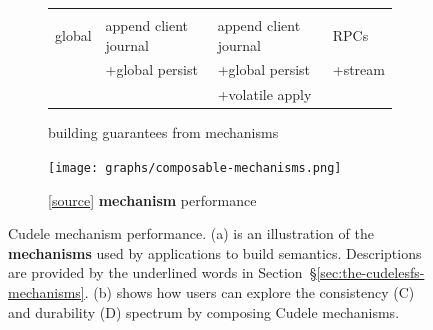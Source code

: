\begin{figure}[tb]
\begin{subfigure}[b]{.32\linewidth}
{\begin{tabular}{ l | l | l | l }
                        &                       &                       &         \\\hdashline
      global            & append client journal & append client journal & RPCs    \\
                        & +global persist       & +global persist       & +stream \\
                        &                       & +volatile apply       &         \\
    \end{tabular}}
    \caption{building guarantees from mechanisms
    }\label{table:spectrum}
  \end{subfigure}
  \begin{subfigure}[b]{.32\linewidth}
    \texttt{[image: graphs/composable-mechanisms.png]}
    \caption{
    [\href{https://github.com/michaelsevilla/cudele-popper/blob/master/experiments/cudele-mechanisms/visualize/viz.ipynb}{source}]
    \textbf{mechanism} performance
    }\label{fig:composable-mechanisms}
  \end{subfigure}
  \caption{Cudele mechanism performance.
    (a) is an illustration of the \textbf{mechanisms} used by applications to build
    semantics. Descriptions are provided by the
    underlined words in Section~\S\ref{sec:the-cudelesfs-mechanisms}.
    (b) shows how users can explore the consistency (C) and
    durability (D) spectrum by composing Cudele mechanisms.
    \vspace{-3ex}}
\end{figure}

